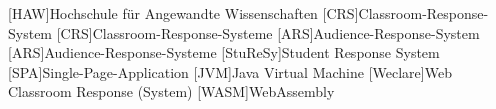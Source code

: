 \begin{acronym}[StuReSy]
    [HAW]{Hochschule für Angewandte Wissenschaften}
    [CRS]{Classroom-Response-System}
    [CRS]{Classroom-Response-Systeme}
    [ARS]{Audience-Response-System}
    [ARS]{Audience-Response-Systeme}
    [StuReSy]{Student Response System}
    [SPA]{Single-Page-Application}
    [JVM]{Java Virtual Machine}
    [Weclare]{Web Classroom Response (System)}
    [WASM]{WebAssembly}
\end{acronym}
